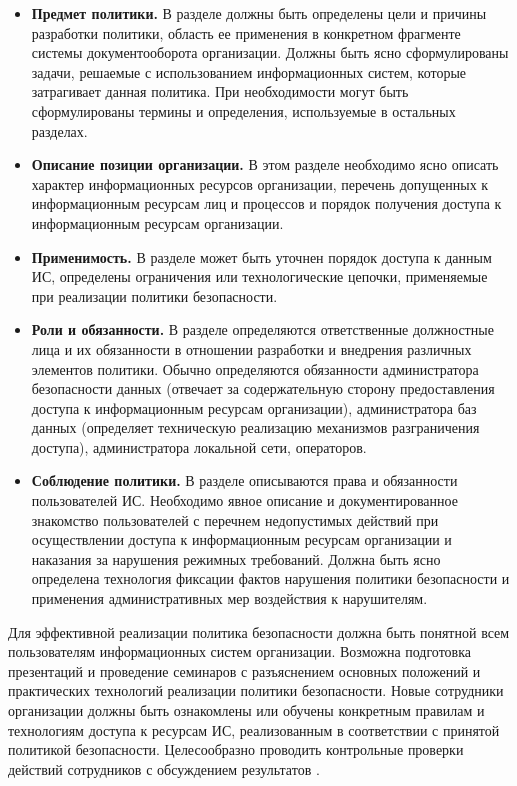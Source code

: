 \begin{itemize}
	\item \textbf{Предмет политики.}
        В разделе должны быть определены цели и причины разработки политики, область ее применения
        в конкретном фрагменте системы документооборота организации. Должны быть ясно сформулированы
        задачи, решаемые с использованием информационных систем, которые затрагивает данная политика.
        При необходимости могут быть сформулированы термины и определения, используемые в остальных разделах.

    \item \textbf{Описание позиции организации.}
        В этом разделе необходимо ясно описать характер информационных ресурсов организации, перечень
        допущенных к информационным ресурсам лиц и процессов и порядок получения доступа к информационным
        ресурсам организации.

    \item \textbf{Применимость.}
        В разделе может быть уточнен порядок доступа к данным ИС, определены ограничения или технологические
        цепочки, применяемые при реализации политики безопасности.

    \item \textbf{Роли и обязанности.}
        В разделе определяются ответственные должностные лица и их обязанности в отношении разработки и
        внедрения различных элементов политики. Обычно определяются обязанности администратора безопасности
        данных (отвечает за содержательную сторону предоставления доступа к информационным ресурсам организации),
        администратора баз данных (определяет техническую реализацию механизмов разграничения доступа),
        администратора локальной сети, операторов.

    \item \textbf{Соблюдение политики.}
        В разделе описываются права и обязанности пользователей ИС. Необходимо явное описание и документированное
        знакомство пользователей с перечнем недопустимых действий при осуществлении доступа к информационным ресурсам
        организации и наказания за нарушения режимных требований. Должна быть ясно определена технология фиксации
        фактов нарушения политики безопасности и применения административных мер воздействия к нарушителям.
\end{itemize}

Для эффективной реализации политика безопасности должна быть понятной всем пользователям информационных
систем организации. Возможна подготовка презентаций и проведение семинаров с разъяснением основных положений
и практических технологий реализации политики безопасности. Новые сотрудники организации должны быть ознакомлены
или обучены конкретным правилам и технологиям доступа к ресурсам ИС, реализованным в соответствии с принятой
политикой безопасности. Целесообразно проводить контрольные проверки действий сотрудников с обсуждением результатов \autocite{shveikin}.

